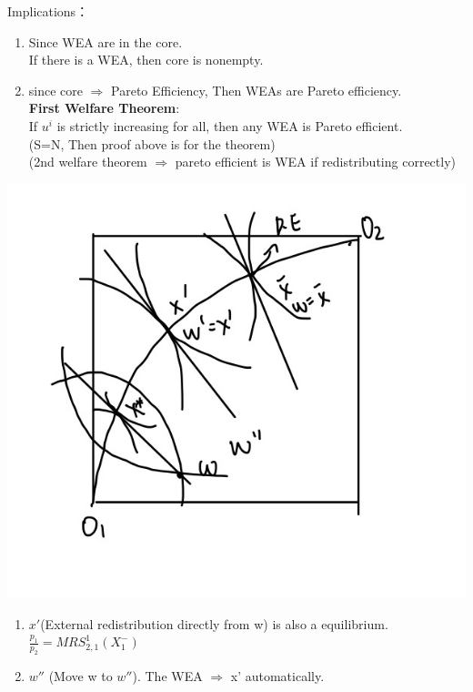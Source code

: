 \documentclass[letterpaper,13pt,single,pdftex]{scrartcl}
\begin{document}
Implications：
\begin{enumerate}
    \item Since WEA are in the core.\\
    If there is a WEA, then core is nonempty. 
    \item since core $\Rightarrow $ Pareto Efficiency, Then WEAs are Pareto efficiency. \\
    \textbf{First Welfare Theorem}:\\
    If $u^i$ is strictly increasing for all, then any WEA is Pareto efficient.\\
    (S=N, Then proof above is for the theorem)\\
    (2nd welfare theorem $\Rightarrow$ pareto efficient is WEA if redistributing correctly)\\
\end{enumerate}
    \includegraphics[scale = 0.3]{WEA-3.jpg}
\begin{enumerate}
    \item $x'$(External redistribution directly from w) is also a equilibrium.\\
    $\frac{p_1}{p_2} = MRS_{2,1}^1(X_1^-)$
    \item $w''$ (Move w to $w''$). The WEA $\Rightarrow$ x' automatically.\\
\end{enumerate}
    
\end{document}

